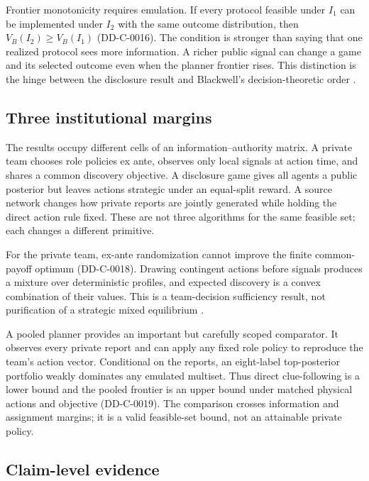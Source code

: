 \documentclass[11pt]{article}
\theoremstyle{remark}
\begin{document}
Frontier monotonicity requires emulation. If every protocol feasible under $I_1$
can be implemented under $I_2$ with the same outcome distribution, then
$V_B(I_2)\ge V_B(I_1)$ (DD-C-0016). The condition is stronger than saying that one
realized protocol sees more information. A richer public signal can change a game
and its selected outcome even when the planner frontier rises. This distinction is
the hinge between the disclosure result and Blackwell's decision-theoretic order
\citep{Blackwell1953,KamenicaGentzkow2011}.

\subsection{Three institutional margins}

The results occupy different cells of an information--authority matrix. A private
team chooses role policies ex ante, observes only local signals at action time,
and shares a common discovery objective. A disclosure game gives all agents a
public posterior but leaves actions strategic under an equal-split reward. A
source network changes how private reports are jointly generated while holding
the direct action rule fixed. These are not three algorithms for the same
feasible set; each changes a different primitive.

For the private team, ex-ante randomization cannot improve the finite common-payoff
optimum (DD-C-0018). Drawing contingent actions before signals produces a mixture
over deterministic profiles, and expected discovery is a convex combination of
their values. This is a team-decision sufficiency result, not purification of a
strategic mixed equilibrium \citep{MarschakRadner1972}.

A pooled planner provides an important but carefully scoped comparator. It
observes every private report and can apply any fixed role policy to reproduce the
team's action vector. Conditional on the reports, an eight-label top-posterior
portfolio weakly dominates any emulated multiset. Thus direct clue-following is a
lower bound and the pooled frontier is an upper bound under matched physical
actions and objective (DD-C-0019). The comparison crosses information and
assignment margins; it is a valid feasible-set bound, not an attainable private
policy.

\subsection{Claim-level evidence}
\end{document}
